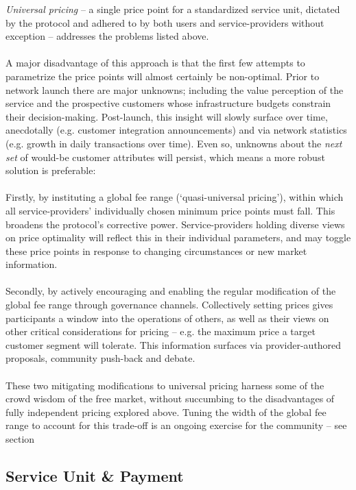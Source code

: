 \documentclass[longbibliography,nofootinbib]{revtex4-1}
\begin{document}
\textit{Universal pricing} – a single price point for a standardized service unit, dictated by the protocol and adhered to by both users and service-providers without exception – addresses the problems listed above. 
\\\\
A major disadvantage of this approach is that the first few attempts to parametrize the price points will almost certainly be non-optimal. Prior to network launch there are major unknowns; including the value perception of the service and the prospective customers whose infrastructure budgets constrain their decision-making. Post-launch, this insight will slowly surface over time, anecdotally (e.g. customer integration announcements) and via network statistics (e.g. growth in daily transactions over time). Even so, unknowns about the \textit{next set} of would-be customer attributes will persist, which means a more robust solution is preferable: 
\\\\
Firstly, by instituting a global fee range (‘quasi-universal pricing’), within which all service-providers’ individually chosen minimum price points must fall. This broadens the protocol's corrective power. Service-providers holding diverse views on price optimality will reflect this in their individual parameters, and may toggle these price points in response to changing circumstances or new market information.
\\\\
Secondly, by actively encouraging and enabling the regular modification of the global fee range through governance channels. Collectively setting prices gives participants a window into the operations of others, as well as their views on other critical considerations for pricing – e.g. the maximum price a target customer segment will tolerate. This information surfaces via provider-authored proposals, community push-back and debate. 
\\\\
These two mitigating modifications to universal pricing harness some of the crowd wisdom of the free market, without succumbing to the disadvantages of fully independent pricing explored above. Tuning the width of the global fee range to account for this trade-off is an ongoing exercise for the community – see section 

\subsection{Service Unit \& Payment}
\end{document}

